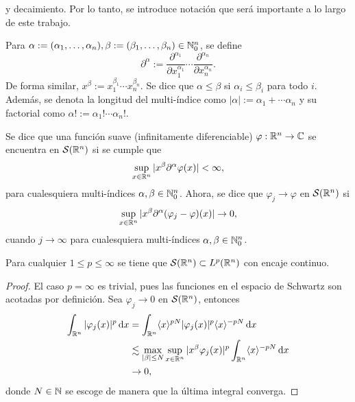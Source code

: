 y decaimiento.
Por lo tanto, se introduce notación que será importante a lo largo de este trabajo. 
\begin{definition}
    Para $\alpha:=(\alpha_1, \ldots, \alpha_n), \beta:=(\beta_1, \ldots, \beta_n) 
    \in \mathbb{N}_0^n$, se define 
    \begin{equation*}
        \partial^\alpha := \frac{\partial^{\alpha_1}}{\partial x_1^{\alpha_1}}
        \cdots \frac{\partial^{\alpha_n}}{\partial x_n^{\alpha_n}}.
    \end{equation*}
    De forma similar, $x^\beta := x_1^{\beta_1} \cdots x_n^{\beta_n}$. Se dice 
    que $\alpha \leq \beta$ si $\alpha_i \leq \beta_i$ para todo $i$. Además, 
    se denota la longitud del multi-índice como
    $|\alpha| := \alpha_1 + \cdots \alpha_n$ y su factorial como
    $\alpha! := \alpha_1! \cdots \alpha_n!$.
\end{definition}

\begin{definition}
    Se dice que una función suave (infinitamente diferenciable) 
    $\varphi:\mathbb{R}^n\rightarrow\mathbb{C}$ se encuentra en $\mathcal{S}(\mathbb{R}^n)$ si se 
    cumple que
    \begin{equation*}
        \sup_{x\in\mathbb{R}^n}|x^\beta \partial^\alpha \varphi(x)| < \infty, 
    \end{equation*}
    para cualesquiera multi-índices $\alpha, \beta \in \mathbb{N}_0^n$. Ahora,
    se dice que $\varphi_j\rightarrow\varphi$ en $\mathcal{S}(\mathbb{R}^n)$ si
    \begin{equation*}
        \sup_{x\in\mathbb{R}^n}|x^\beta \partial^\alpha (\varphi_j-
        \varphi)(x)| \rightarrow 0, 
    \end{equation*}
    cuando $j\rightarrow\infty$ para cualesquiera multi-índices 
    $\alpha, \beta \in \mathbb{N}_0^n$.
\end{definition}
\begin{proposition}
    Para cualquier $1\leq p\leq\infty$ se tiene que 
    $\mathcal{S}(\mathbb{R}^n)\subset L^p(\mathbb{R}^n)$ con encaje continuo.
\end{proposition}
\begin{proof}
    El caso $p=\infty$ es trivial, pues las funciones en el espacio de Schwartz
    son acotadas por definición.
    Sea $\varphi_j\rightarrow0$ en $\mathcal{S}(\mathbb{R}^n)$, entonces
    \begin{align*}
        \int_{\mathbb{R}^n} |\varphi_j(x)|^p \mathop{}\!\mathrm{d} x & = 
        \int_{\mathbb{R}^n} \langle x\rangle^{pN} |\varphi_j(x)|^p \langle x\rangle^{-pN} \mathop{}\!\mathrm{d} x \\ 
        & \lesssim \max_{|\beta|\leq N} \sup_{x\in\mathbb{R}^n} 
        |x^\beta\varphi_j(x)|^p \int_{\mathbb{R}^n}\langle x\rangle^{-pN} \mathop{}\!\mathrm{d} x \\
        & \rightarrow 0,
    \end{align*}
    donde $N\in\mathbb{N}$ se escoge de manera que la última integral converga. 
\end{proof}


